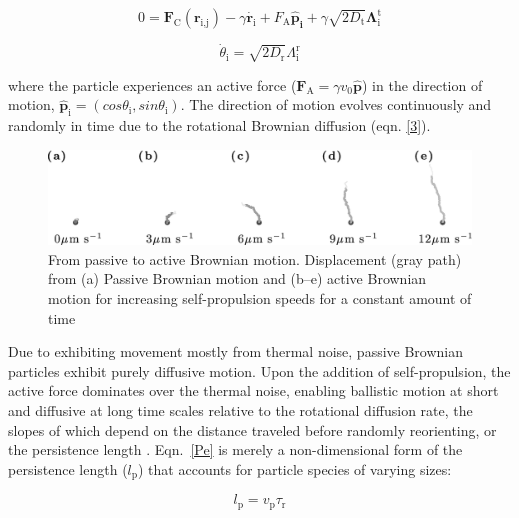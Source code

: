 \documentclass[11pt]{article}
\begin{document}
\begin{equation}\label{2}
        0 = \boldsymbol{F}_{\text{C}}(\boldsymbol{r}_{\text{i,j}})-\gamma \dot{\boldsymbol{r}_{\text{i}}}+F_{\text{A}}\boldsymbol{\hat{p}_{\text{i}}}+\gamma\sqrt{2D_\text{t}}\boldsymbol{\Lambda}^{\text{t}}_{\text{i}}
\end{equation}

\begin{equation}\label{3}
    \dot{\theta}_{\text{i}} = \sqrt{2D_\text{r}}\Lambda^\text{r}_\text{i}
\end{equation}

\noindent where the particle experiences an active force ($\boldsymbol{F}_{\text{A}}=\gamma v_{\text{0}}\boldsymbol{\hat{p}}$) in the direction of motion, $\boldsymbol{\hat{p}}_{\text{i}}=(cos\theta_{\text{i}},sin\theta_{\text{i}} )$.  The direction of motion evolves continuously and randomly in time due to the rotational Brownian diffusion (eqn. \ref{3}).  

\begin{figure}[ht]
\centering\includegraphics[width=1.0\linewidth]{462743_1_En_7_Fig2_HTML.png}
\caption{From passive to active Brownian motion. Displacement (gray path) from (a) Passive Brownian motion and (b–e) active Brownian motion for increasing self-propulsion speeds for a constant amount of time \cite{Toschi}}
\label{fig:displacement}
\end{figure}

Due to exhibiting movement mostly from thermal noise, passive Brownian particles exhibit purely diffusive motion.  Upon the addition of self-propulsion, the active force dominates over the thermal noise, enabling ballistic motion at short and diffusive at long time scales relative to the rotational diffusion rate, the slopes of which depend on the distance traveled before randomly reorienting, or the persistence length \cite{Toschi}.  Eqn.~\ref{Pe} is merely a non-dimensional form of the persistence length ($l_{\text{p}}$) that accounts for particle species of varying sizes:

\begin{equation}\label{area}
    l_{\text{p}} = v_{\text{p}} \tau_{\text{r}}
\end{equation}
\end{document}
